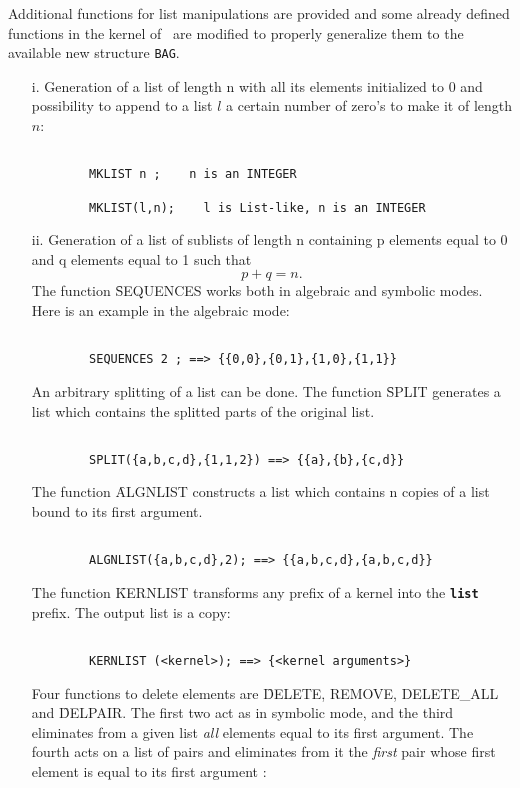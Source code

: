 Additional functions for list manipulations are provided and some already
defined functions in the kernel of \REDUCE\ are modified to properly
generalize them to the available new structure {\tt BAG}.
\begin{itemize}
\item[i.]
Generation of a list of length n with all its elements initialized to 0
and possibility to append to a list $l$ a certain number of
zero's to make it of length $n$:
\begin{verbatim}

        MKLIST n ;    n is an INTEGER

        MKLIST(l,n);    l is List-like, n is an INTEGER

\end{verbatim}

\item[ii.]
Generation of a list of sublists of length n containing p elements
equal to 0 and q elements equal to 1 such that  $$p+q=n .$$
The function \f{SEQUENCES} works both in algebraic and
symbolic modes.  Here is an example in the algebraic mode:
\begin{verbatim}

        SEQUENCES 2 ; ==> {{0,0},{0,1},{1,0},{1,1}}

\end{verbatim}
An arbitrary splitting of a list can be done. The function \f{SPLIT} 
generates a list which contains the splitted parts of the original list.
\begin{verbatim}
        
        SPLIT({a,b,c,d},{1,1,2}) ==> {{a},{b},{c,d}}

\end{verbatim}
The function \f{ALGNLIST} constructs a list which contains n copies  
of a list bound to its first argument.
\begin{verbatim}

        ALGNLIST({a,b,c,d},2); ==> {{a,b,c,d},{a,b,c,d}}

\end{verbatim}
The function \f{KERNLIST} transforms any prefix of a kernel into the
{\bf \verb+list+} prefix. The output list is a copy:
\begin{verbatim}

        KERNLIST (<kernel>); ==> {<kernel arguments>}

\end{verbatim}
Four functions to delete elements are \f{DELETE, REMOVE, DELETE\_ALL} and
\f{DELPAIR}. The first two act as in symbolic mode, and the third
eliminates from a given list {\em all}
elements equal to its first argument. The fourth acts on a list of pairs
and eliminates from it the {\em first} pair whose first element is equal to
its first argument :
\begin{verbatim}


\end{verbatim}
\end{itemize}
